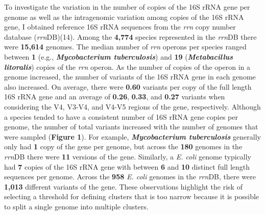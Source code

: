 \documentclass[
]{article}
\begin{document}
To investigate the variation in the number of copies of the 16S rRNA
gene per genome as well as the intragenomic variation among copies of
the 16S rRNA gene, I obtained reference 16S rRNA sequences from the
\emph{rrn} copy number database (\emph{rrn}DB)(14). Among the
\textbf{4,774} species represented in the \emph{rrn}DB there were
\textbf{15,614} genomes. The median number of \emph{rrn} operons per
species ranged between \textbf{1} (e.g., \textbf{\emph{Mycobacterium
tuberculosis}}) and \textbf{19} (\textbf{\emph{Metabacillus litoralis}})
copies of the \emph{rrn} operon. As the number of copies of the operon
in a genome increased, the number of variants of the 16S rRNA gene in
each genome also increased. On average, there were \textbf{0.60}
variants per copy of the full length 16S rRNA gene and an average of
\textbf{0.26}, \textbf{0.33}, and \textbf{0.27} variants when
considering the V4, V3-V4, and V4-V5 regions of the gene, respectively.
Although a species tended to have a consistent number of 16S rRNA gene
copies per genome, the number of total variants increased with the
number of genomes that were sampled (\textbf{Figure 1}). For example,
\textbf{\emph{Mycobacterium tuberculosis}} generally only had \textbf{1}
copy of the gene per genome, but across the \textbf{180} genomes in the
\emph{rrn}DB there were \textbf{11} versions of the gene. Similarly, a
\emph{E. coli} genome typically had \textbf{7} copies of the 16S rRNA
gene with between \textbf{6} and \textbf{10} distinct full length
sequences per genome. Across the \textbf{958} \emph{E. coli} genomes in
the \emph{rrn}DB, there were \textbf{1,013} different variants of the
gene. These observations highlight the risk of selecting a threshold for
defining clusters that is too narrow because it is possible to split a
single genome into multiple clusters.
\end{document}

